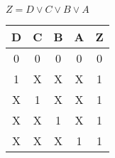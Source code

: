
\begin{center}
    {\(Z = D \lor C \lor B \lor A \)}
    \begin{table}[h] %
        \begin{center}
            \begin{tabular}{|c|c|c|c||c|} \hline
            D & C & B & A & Z \\ \hline\hline
            0 & 0 & 0 & 0 & 0 \\ \hline
            1 & X & X & X & 1 \\ \hline
            X & 1 & X & X & 1 \\ \hline
            X & X & 1 & X & 1 \\ \hline
            X & X & X & 1 & 1 \\ \hline
            \end{tabular}
        \end{center}
    \end{table}
\end{center}
